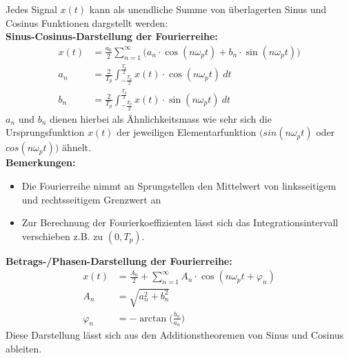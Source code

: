 \documentclass[12pt,a4paper]{scrartcl}
\begin{document}
Jedes Signal $x(t)$ kann als unendliche Summe von überlagerten Sinus und Cosinus Funktionen dargstellt werden: \\

\noindent  \textbf{Sinus-Cosinus-Darstellung der Fourierreihe:}
\begin{equation}
  \label{eq:1}
  \begin{split}
  x(t) &=\frac{a_0}{2} \sum_{n=1}^{\infty}\big(a_n \cdot \cos(n \omega_p t) + b_n \cdot \sin(n \omega_p t)   \big)  \\
a_n &= \frac{2}{T_p} \int_{-\frac{T_p}{2}}^{\frac{T_p}{2}} x(t) \cdot \cos(n\omega_p t)\ dt \\
b_n &= \frac{2}{T_p} \int_{-\frac{T_p}{2}}^{\frac{T_p}{2}} x(t) \cdot \sin(n\omega_p t)\ dt
    \end{split}
\end{equation}
\noindent $a_n$ und $b_n$ dienen hierbei als Ähnlichkeitsmass wie sehr sich die Ursprungsfunktion $x(t)$ der jeweiligen Elementarfunktion $\big(sin(n\omega_p t)$ oder $cos(n\omega_p t)\big)$ ähnelt.\\

\noindent \textbf{Bemerkungen:}
    \begin{itemize}
      \item Die Fourierreihe nimmt an Sprungstellen den Mittelwert von linksseitigem und rechtsseitigem Grenzwert an
      \item Zur Berechnung der Fourierkoeffizienten lässt sich das Integrationsintervall verschieben z.B. zu $(0,T_p)$. \\
    \end{itemize} 

    \noindent \textbf{Betrags-/Phasen-Darstellung der Fourierreihe:}
\begin{equation}
    \label{eq:2}
    \begin{split}
    x(t) &=\frac{A_0}{2} + \sum_{n=1}^{\infty} A_n \cdot \cos(n \omega_p t + \varphi_n)  \\
  A_n &= \sqrt{a^2_n + b^2_n} \\
  \varphi_n &= -\arctan\Big(\frac{b_n}{a_n}\Big)
      \end{split}
  \end{equation}
  \noindent Diese Darstellung lässt sich aus den Additionstheoremen von Sinus und Cosinus ableiten. \\
\end{document}
